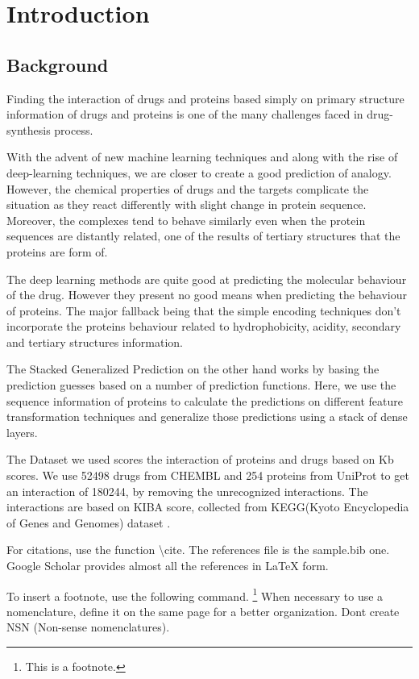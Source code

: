 \chapter{Introduction}


\section{Background}
Finding the interaction of drugs and proteins based simply on primary structure information of drugs and proteins is one of the many challenges faced in drug-synthesis process.

With the advent of new machine learning techniques and along with the rise of deep-learning techniques, we are closer to create a good prediction of analogy.
However, the chemical properties of drugs and the targets complicate the situation as they react differently with slight change in protein sequence. Moreover, the complexes tend to behave similarly even when the protein sequences are distantly related, one of the results of tertiary structures that the proteins are form of.

The deep learning methods are quite good at predicting the molecular behaviour of the drug. However they present no good means when predicting the behaviour of proteins. The major fallback being that the simple encoding techniques don’t incorporate the proteins behaviour related to hydrophobicity, acidity, secondary and tertiary structures information.

The Stacked Generalized Prediction on the other hand works by basing the prediction guesses based on a number of prediction functions. Here, we use the sequence information of proteins to calculate the predictions on different feature transformation techniques and generalize those predictions using a stack of dense layers.
\iffalse
(52498, 254)
180244
\fi
The Dataset we used scores the interaction of proteins and drugs based on Kb scores. We use 52498 drugs from CHEMBL and 254 proteins from UniProt to get an interaction of 180244, by removing the unrecognized interactions. The interactions are based on KIBA score, collected from KEGG(​Kyoto Encyclopedia of Genes and Genomes)​ dataset \cite{Kanehisa2000}.

\iffalse

For citations, use the function \textbackslash cite. \cite{gowar1989power} The references file is the sample.bib one. Google Scholar provides almost all the references in LaTeX form.

To insert a footnote, use the following command. \footnote{This is a footnote.} When necessary to use a nomenclature, define it on the same page for a better organization. Dont create NSN (Non-sense nomenclatures).

